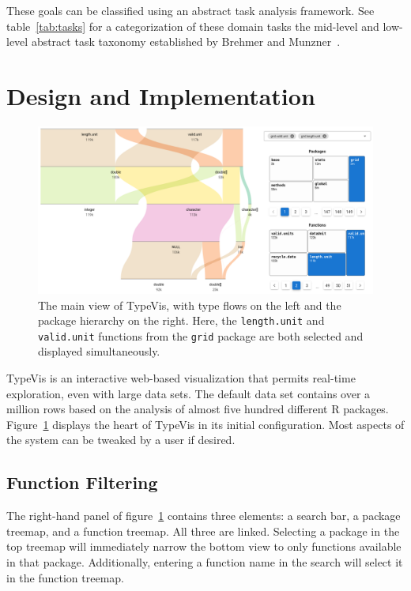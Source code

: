 \documentclass{vgtc}                          %
\newcommand{\typevis}{{\sc TypeVis}\xspace}
\begin{document}
These goals can be classified using an abstract task analysis framework.
See table~\ref{tab:tasks} for a categorization of these domain tasks
the mid-level and low-level abstract task taxonomy
established by Brehmer and Munzner~\cite{brehmer:2013}.


\section{Design and Implementation}

\begin{figure}
 \centering
 \includegraphics[width=\linewidth]{img/typevis.png}
 \caption{The main view of \typevis, with type flows on the left and the package hierarchy on the right. Here, the {\tt length.unit} and {\tt valid.unit} functions from the {\tt grid} package are both selected and displayed simultaneously.}
 \label{fig:typevis}
\end{figure}

\typevis is an interactive web-based visualization
that permits real-time exploration,
even with large data sets.
The default data set contains over a million rows
based on the analysis of almost five hundred
different R packages.
Figure~\ref{fig:typevis} displays
the heart of \typevis
in its initial configuration.
Most aspects of the system can be tweaked
by a user if desired.

\subsection{Function Filtering}

The right-hand panel of figure~\ref{fig:typevis}
contains three elements: a search bar,
a package treemap,
and a function treemap.
All three are linked.
Selecting a package
in the top treemap will immediately narrow the
bottom view to only functions available in that package.
Additionally, entering a function name in the search
will select it in the function treemap.
\end{document}
